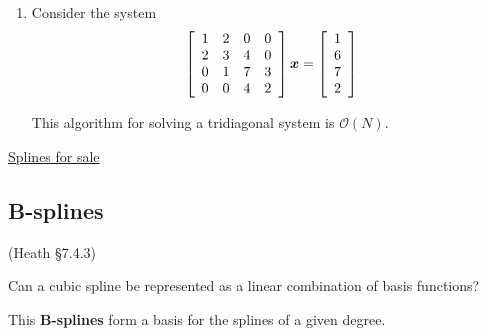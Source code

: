 \documentclass[12pt,letterpaper,noanswers]{exam}
\newcommand{\vc}[1]{\boldsymbol{#1}}
\begin{document}
\begin{enumerate}[resume=classQ]
\item Consider the system \[\left[\begin{array}{c c c c}
1 & 2 & 0 & 0 \\
2 & 3 & 4 & 0 \\
0 & 1 & 7 & 3\\
0 & 0 & 4 & 2
\end{array}\right]\vc{x} = \left[\begin{array}{c} 
1 \\ 6 \\ 7 \\ 2
\end{array}\right]\]


This algorithm for solving a tridiagonal system is $\mathcal{O}(N)$.
\end{enumerate}


\href{https://edsonmarine.com/set-of-six-bronze-spline-weights/}{Splines for sale}

\subsection*{B-splines}

(Heath \S 7.4.3)

\begin{tcolorbox}
Can a cubic spline be represented as a linear combination of basis functions?

This \textbf{B-splines} form a basis for the splines of a given degree.
\end{tcolorbox}
\end{document}
